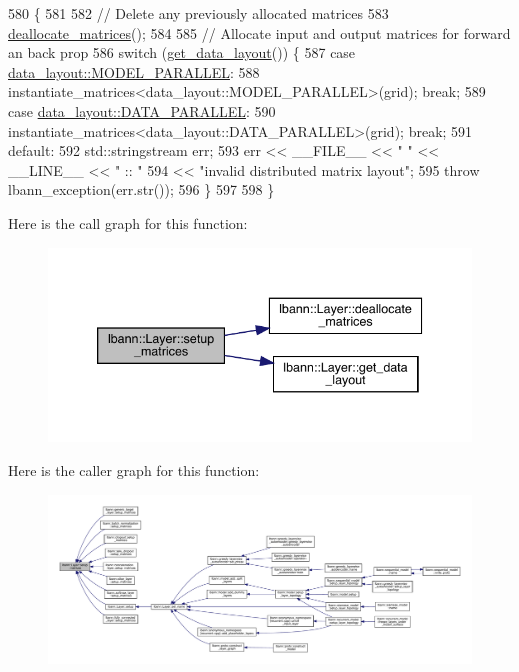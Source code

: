 \begin{DoxyCode}
580                                              \{
581 
582   \textcolor{comment}{// Delete any previously allocated matrices}
583   \hyperlink{classlbann_1_1Layer_a888392d6ac6906093a8125c6a37de075}{deallocate\_matrices}();
584 
585   \textcolor{comment}{// Allocate input and output matrices for forward an back prop}
586   \textcolor{keywordflow}{switch} (\hyperlink{classlbann_1_1Layer_a5dfb66e81fc085997402a5e2241316bd}{get\_data\_layout}()) \{
587   \textcolor{keywordflow}{case} \hyperlink{base_8hpp_a786677cbfb3f5677b4d84f3056eb08dbac94d7b0e44ab8bdcdad694a673cdeae0}{data\_layout::MODEL\_PARALLEL}:
588     instantiate\_matrices<data\_layout::MODEL\_PARALLEL>(grid); \textcolor{keywordflow}{break};
589   \textcolor{keywordflow}{case} \hyperlink{base_8hpp_a786677cbfb3f5677b4d84f3056eb08dba37d2a3465f7cbf4ab60f4e79944d0638}{data\_layout::DATA\_PARALLEL}:
590     instantiate\_matrices<data\_layout::DATA\_PARALLEL>(grid); \textcolor{keywordflow}{break};
591   \textcolor{keywordflow}{default}:
592     std::stringstream err;
593     err << \_\_FILE\_\_ << \textcolor{stringliteral}{" "} << \_\_LINE\_\_ << \textcolor{stringliteral}{" :: "}
594         << \textcolor{stringliteral}{"invalid distributed matrix layout"};
595     \textcolor{keywordflow}{throw} lbann\_exception(err.str());
596   \}
597 
598 \}
\end{DoxyCode}
Here is the call graph for this function\+:\nopagebreak
\begin{figure}[H]
\begin{center}
\leavevmode
\includegraphics[width=339pt]{classlbann_1_1Layer_a57bbe21131dc00ab5cf9ea5e3656808e_cgraph}
\end{center}
\end{figure}
Here is the caller graph for this function\+:\nopagebreak
\begin{figure}[H]
\begin{center}
\leavevmode
\includegraphics[width=350pt]{classlbann_1_1Layer_a57bbe21131dc00ab5cf9ea5e3656808e_icgraph}
\end{center}
\end{figure}
